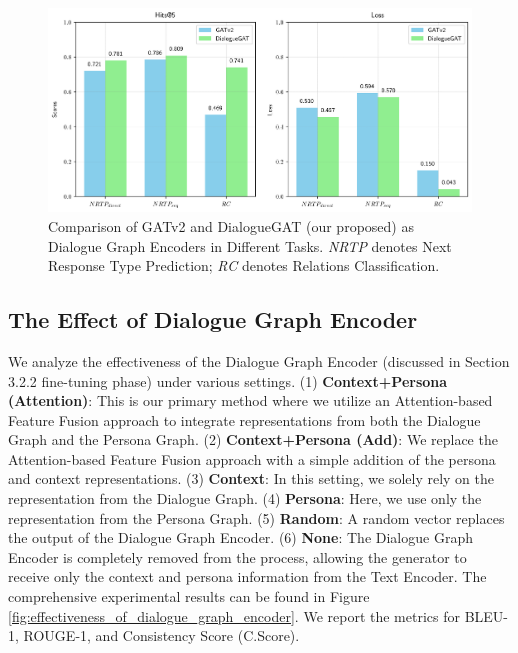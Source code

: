 \begin{figure}[H]
    \centering
    \includegraphics[width=1.0\textwidth]{./context/experiment/images/compare_gatv2_dialoguegat.png}
    \caption{Comparison of GATv2 and DialogueGAT (our proposed) as Dialogue Graph Encoders in Different Tasks. \textit{NRTP} denotes Next Response Type Prediction; \textit{RC} denotes Relations Classification.}
    \label{fig:compare_gatv2_dialoguegat}
\end{figure}

\subsection{The Effect of Dialogue Graph Encoder}
We analyze the effectiveness of the Dialogue Graph Encoder (discussed in Section 3.2.2 fine-tuning phase) under various settings. (1) \textbf{Context+Persona (Attention)}: This is our primary method where we utilize an Attention-based Feature Fusion approach to integrate representations from both the Dialogue Graph and the Persona Graph. (2) \textbf{Context+Persona (Add)}: We replace the Attention-based Feature Fusion approach with a simple addition of the persona and context representations. (3) \textbf{Context}: In this setting, we solely rely on the representation from the Dialogue Graph. (4) \textbf{Persona}: Here, we use only the representation from the Persona Graph. (5) \textbf{Random}: A random vector replaces the output of the Dialogue Graph Encoder. (6) \textbf{None}: The Dialogue Graph Encoder is completely removed from the process, allowing the generator to receive only the context and persona information from the Text Encoder. The comprehensive experimental results can be found in Figure \ref{fig:effectiveness_of_dialogue_graph_encoder}. We report the metrics for BLEU-1, ROUGE-1, and Consistency Score (C.Score).

